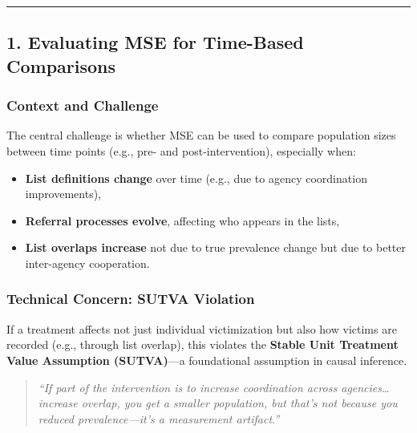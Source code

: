 \documentclass[
  12pt,
]{article}
\theoremstyle{plain}
\theoremstyle{definition}
\begin{document}
\begin{center}\rule{0.5\linewidth}{0.5pt}\end{center}

\subsection{\texorpdfstring{\textbf{1. Evaluating MSE for Time-Based
Comparisons}}{1. Evaluating MSE for Time-Based Comparisons}}\label{evaluating-mse-for-time-based-comparisons}

\subsubsection{\texorpdfstring{\textbf{Context and
Challenge}}{Context and Challenge}}\label{context-and-challenge}

The central challenge is whether MSE can be used to compare population
sizes between time points (e.g., pre- and post-intervention), especially
when:

\begin{itemize}
\item
  \textbf{List definitions change} over time (e.g., due to agency
  coordination improvements),
\item
  \textbf{Referral processes evolve}, affecting who appears in the
  lists,
\item
  \textbf{List overlaps increase} not due to true prevalence change but
  due to better inter-agency cooperation.
\end{itemize}

\subsubsection{\texorpdfstring{\textbf{Technical Concern: SUTVA
Violation}}{Technical Concern: SUTVA Violation}}\label{technical-concern-sutva-violation}

If a treatment affects not just individual victimization but also how
victims are recorded (e.g., through list overlap), this violates the
\textbf{Stable Unit Treatment Value Assumption (SUTVA)}---a foundational
assumption in causal inference.

\begin{quote}
\emph{``If part of the intervention is to increase coordination across
agencies\ldots{} increase overlap, you get a smaller population, but
that's not because you reduced prevalence---it's a measurement
artifact.''}
\end{quote}
\end{document}

